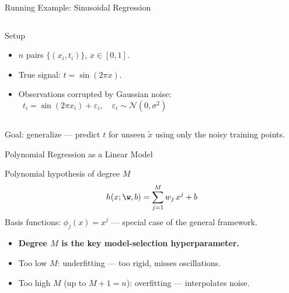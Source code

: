 \begin{frame}{Running Example: Sinusoidal Regression}
  \begin{columns}[T]
  \begin{exampleblock}{Setup}
    \begin{itemize}
      \item $n$ pairs $\{(x_i,t_i)\}$, $x\in[0,1]$.
      \item True signal: $t = \sin(2\pi x)$.
      \item Observations corrupted by Gaussian noise:
      \[ t_i = \sin(2\pi x_i) + \varepsilon_i, \quad \varepsilon_i\sim\mathcal{N}(0,\sigma^2) \]
    \end{itemize}
  \end{exampleblock}
  \begin{center}
  \end{center}
  \end{columns}
  \vspace{.2em}
  Goal: \alert{generalize} — predict $t$ for unseen $\tilde{x}$ using only the noisy training points.
\end{frame}

\begin{frame}{Polynomial Regression as a Linear Model}
  \begin{block}{Polynomial hypothesis of degree $M$}
    \[
      h(x;\w,b) = \sum_{j=1}^M w_j\,x^j + b
    \]
    Basis functions: $\phi_j(x)=x^j$ — special case of the general framework.
  \end{block}
  \vspace{.3em}
  \begin{itemize}
    \item \textbf{Degree $M$ is the key model-selection hyperparameter.}
    \item Too low $M$: \alert{underfitting} — too rigid, misses oscillations.
    \item Too high $M$ (up to $M{+}1=n$): \alert{overfitting} — interpolates noise.
  \end{itemize}
\end{frame}

